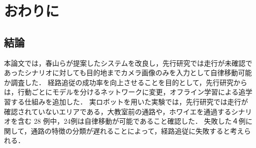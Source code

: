 \chapter{おわりに}
\label{chap:end}
\section{結論}
本論文では，春山らが提案したシステムを改良し，先行研究では走行が未確認であったシナリオに対しても目的地までカメラ画像のみを入力として自律移動可能か調査した．
経路追従の成功率を向上させることを目的として，先行研究からは，行動ごとにモデルを分けるネットワークに変更，オフライン学習による追学習する仕組みを追加した．
実ロボットを用いた実験では，先行研究では走行が確認されていないエリアである，大教室前の通路や，ホワイエを通過するシナリオを含む 28 例中，24例は自律移動が可能であること確認した．
失敗した４例に関して，通路の特徴の分類が遅れることによって，経路追従に失敗すると考えられる．